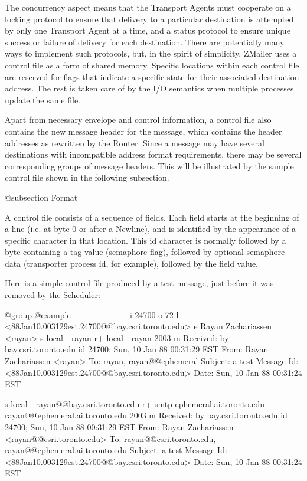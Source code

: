 {{The concurrency aspect means that the Transport Agents must cooperate
on a locking protocol to ensure that delivery to a particular destination
is attempted by only one Transport Agent at a time, and a status protocol
to ensure unique success or failure of delivery for each destination.
There are potentially many ways to implement such protocols, but, in
the spirit of simplicity, ZMailer uses a control file as a form of shared
memory.
Specific locations within each control file are reserved for flags that
indicate a specific state for their associated destination address.
The rest is taken care of by the I/O semantics when multiple processes
update the same file.

Apart from necessary envelope and control information, a control file also
contains the new message header for the message, which contains the header
addresses as rewritten by the Router.
Since a message may have several destinations with incompatible address
format requirements, there may be several corresponding groups of message
headers.
This will be illustrated by the sample control file shown in the following
subsection.

@subsection Format

A control file consists of a sequence of fields.
Each field starts at the beginning of a line (i.e. at byte 0 or
after a Newline), and is identified by the appearance of a specific
character in that location.
This id character is normally followed by a byte containing a tag value
(semaphore flag), followed by optional semaphore data (transporter process
id, for example), followed by the field value.

Here is a simple control file produced by a test message, just before it was
removed by the Scheduler:

@group
@example
--------------------
i 24700
o 72
l <88Jan10.003129est.24700@@bay.csri.toronto.edu>
e Rayan Zachariassen <rayan>
s local - rayan
r+      local - rayan 2003
m
Received: by bay.csri.toronto.edu id 24700; Sun, 10 Jan 88 00:31:29 EST
From:   Rayan Zachariassen <rayan>
To:     rayan, rayan@@ephemeral
Subject: a test
Message-Id: <88Jan10.003129est.24700@@bay.csri.toronto.edu>
Date:   Sun, 10 Jan 88 00:31:24 EST

s local - rayan@@bay.csri.toronto.edu
r+      smtp ephemeral.ai.toronto.edu rayan@@ephemeral.ai.toronto.edu 2003
m
Received: by bay.csri.toronto.edu id 24700; Sun, 10 Jan 88 00:31:29 EST
From:   Rayan Zachariassen <rayan@@csri.toronto.edu>
To:     rayan@@csri.toronto.edu, rayan@@ephemeral.ai.toronto.edu
Subject: a test
Message-Id: <88Jan10.003129est.24700@@bay.csri.toronto.edu>
Date:   Sun, 10 Jan 88 00:31:24 EST

}}
